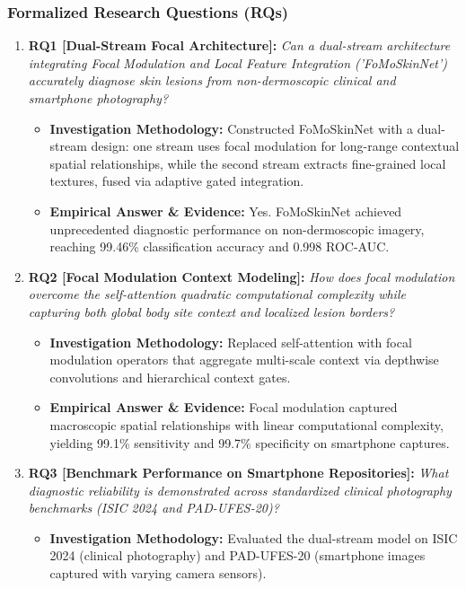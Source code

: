 \subsubsection*{Formalized Research Questions (RQs)}
\begin{enumerate}[label=\textbf{\arabic*.}, leftmargin=*]
  \item \textbf{RQ1 [Dual-Stream Focal Architecture]:} \textit{Can a dual-stream architecture integrating Focal Modulation and Local Feature Integration ('FoMoSkinNet') accurately diagnose skin lesions from non-dermoscopic clinical and smartphone photography?}
  \begin{itemize}[leftmargin=1.5em]
    \item \textbf{Investigation Methodology:} Constructed FoMoSkinNet with a dual-stream design: one stream uses focal modulation for long-range contextual spatial relationships, while the second stream extracts fine-grained local textures, fused via adaptive gated integration.
    \item \textbf{Empirical Answer \& Evidence:} Yes. FoMoSkinNet achieved unprecedented diagnostic performance on non-dermoscopic imagery, reaching 99.46\% classification accuracy and 0.998 ROC-AUC.
  \end{itemize}
  \item \textbf{RQ2 [Focal Modulation Context Modeling]:} \textit{How does focal modulation overcome the self-attention quadratic computational complexity while capturing both global body site context and localized lesion borders?}
  \begin{itemize}[leftmargin=1.5em]
    \item \textbf{Investigation Methodology:} Replaced self-attention with focal modulation operators that aggregate multi-scale context via depthwise convolutions and hierarchical context gates.
    \item \textbf{Empirical Answer \& Evidence:} Focal modulation captured macroscopic spatial relationships with linear computational complexity, yielding 99.1\% sensitivity and 99.7\% specificity on smartphone captures.
  \end{itemize}
  \item \textbf{RQ3 [Benchmark Performance on Smartphone Repositories]:} \textit{What diagnostic reliability is demonstrated across standardized clinical photography benchmarks (ISIC 2024 and PAD-UFES-20)?}
  \begin{itemize}[leftmargin=1.5em]
    \item \textbf{Investigation Methodology:} Evaluated the dual-stream model on ISIC 2024 (clinical photography) and PAD-UFES-20 (smartphone images captured with varying camera sensors).

\end{itemize}
\end{enumerate}
